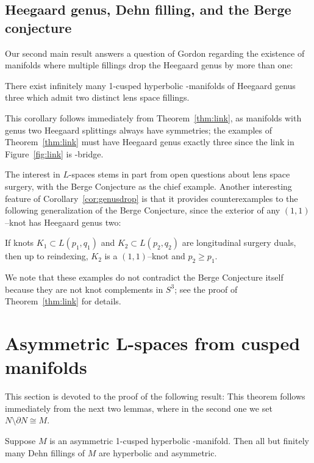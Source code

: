 \subsection{Heegaard genus,  Dehn filling, and the Berge conjecture} 
Our second main result answers a question of Gordon
\cite{GordonAIM} regarding the existence of manifolds where multiple
fillings drop the Heegaard genus by more than one:
\begin{corollary}\label{cor:genusdrop}
  There exist infinitely many 1-cusped hyperbolic \3-manifolds of
  Heegaard genus three which admit two distinct lens space fillings.
\end{corollary}
\noindent
This corollary follows immediately from Theorem~\ref{thm:link}, as
manifolds with genus two Heegaard splittings always have symmetries; 
 the examples of Theorem~\ref{thm:link} must have Heegaard
genus exactly three since the link in Figure~\ref{fig:link} is
\3-bridge. 

The interest in $L$-spaces stems in part from open questions about
lens space surgery, with the Berge Conjecture as the chief example.
Another interesting feature of Corollary~\ref{cor:genusdrop} is that
it provides counterexamples to the following generalization of the
Berge Conjecture, since the exterior of any $(1,1)$--knot has Heegaard
genus two:

\begin{conjecture} 
  If knots $K_1 \subset L(p_1, q_1)$ and $K_2 \subset L(p_2,q_2)$ are
  longitudinal surgery duals, then up to reindexing, $K_2$ is a
  $(1,1)$--knot and $p_2 \geq p_1$.
\end{conjecture}
\noindent
We note that these examples do
not contradict the Berge Conjecture itself because they are not
knot complements in $S^3$; see the proof of Theorem~\ref{thm:link} for details.

\section{Asymmetric L-spaces from cusped manifolds}

This section is devoted to the proof of the following result:
\theoremtheory
\noindent
This theorem follows immediately from the next two lemmas, where in
the second one we set $N \setminus \partial N \cong M$. 

\begin{lemma}\label{lem:hyperdehn}
  Suppose $M$ is an asymmetric 1-cusped hyperbolic \3-manifold.  Then
  all but finitely many Dehn fillings of $M$ are hyperbolic and asymmetric.
\end{lemma}

